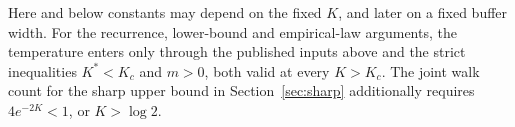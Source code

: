 Here and below constants may depend on the fixed $K$, and later on a fixed buffer width. For the recurrence, lower-bound and empirical-law arguments, the temperature enters only through the published inputs above and the strict inequalities $K^*<K_c$ and $m>0$, both valid at every $K>K_c$. The joint walk count for the sharp upper bound in Section~\ref{sec:sharp} additionally requires $4e^{-2K}<1$, or $K>\log2$.
